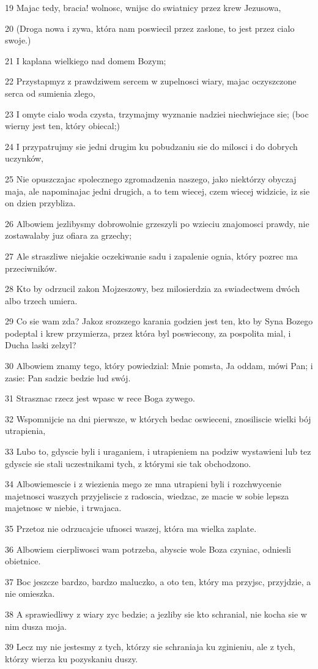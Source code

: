 \par 19 Majac tedy, bracia! wolnosc, wnijsc do swiatnicy przez krew Jezusowa,
\par 20 (Droga nowa i zywa, która nam poswiecil przez zaslone, to jest przez cialo swoje.)
\par 21 I kaplana wielkiego nad domem Bozym;
\par 22 Przystapmyz z prawdziwem sercem w zupelnosci wiary, majac oczyszczone serca od sumienia zlego,
\par 23 I omyte cialo woda czysta, trzymajmy wyznanie nadziei niechwiejace sie; (boc wierny jest ten, który obiecal;)
\par 24 I przypatrujmy sie jedni drugim ku pobudzaniu sie do milosci i do dobrych uczynków,
\par 25 Nie opuszczajac spolecznego zgromadzenia naszego, jako niektórzy obyczaj maja, ale napominajac jedni drugich, a to tem wiecej, czem wiecej widzicie, iz sie on dzien przybliza.
\par 26 Albowiem jezlibysmy dobrowolnie grzeszyli po wzieciu znajomosci prawdy, nie zostawalaby juz ofiara za grzechy;
\par 27 Ale straszliwe niejakie oczekiwanie sadu i zapalenie ognia, który pozrec ma przeciwników.
\par 28 Kto by odrzucil zakon Mojzeszowy, bez milosierdzia za swiadectwem dwóch albo trzech umiera.
\par 29 Co sie wam zda? Jakoz srozszego karania godzien jest ten, kto by Syna Bozego podeptal i krew przymierza, przez która byl poswiecony, za pospolita mial, i Ducha laski zelzyl?
\par 30 Albowiem znamy tego, który powiedzial: Mnie pomsta, Ja oddam, mówi Pan; i zasie: Pan sadzic bedzie lud swój.
\par 31 Strasznac rzecz jest wpasc w rece Boga zywego.
\par 32 Wspomnijcie na dni pierwsze, w których bedac oswieceni, znosiliscie wielki bój utrapienia,
\par 33 Lubo to, gdyscie byli i uraganiem, i utrapieniem na podziw wystawieni lub tez gdyscie sie stali uczestnikami tych, z którymi sie tak obchodzono.
\par 34 Albowiemescie i z wiezienia mego ze mna utrapieni byli i rozchwycenie majetnosci waszych przyjeliscie z radoscia, wiedzac, ze macie w sobie lepsza majetnosc w niebie, i trwajaca.
\par 35 Przetoz nie odrzucajcie ufnosci waszej, która ma wielka zaplate.
\par 36 Albowiem cierpliwosci wam potrzeba, abyscie wole Boza czyniac, odniesli obietnice.
\par 37 Boc jeszcze bardzo, bardzo maluczko, a oto ten, który ma przyjsc, przyjdzie, a nie omieszka.
\par 38 A sprawiedliwy z wiary zyc bedzie; a jezliby sie kto schranial, nie kocha sie w nim dusza moja.
\par 39 Lecz my nie jestesmy z tych, którzy sie schraniaja ku zginieniu, ale z tych, którzy wierza ku pozyskaniu duszy.

